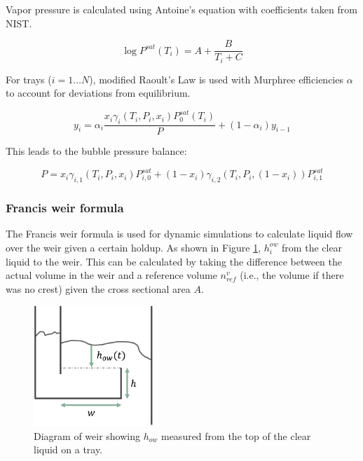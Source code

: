 Vapor pressure is calculated using Antoine’s equation with coefficients taken from NIST. 

\begin{equation}
    \log P^{sat}(T_i) = A + \frac{B}{T_i + C}
\end{equation}

For trays ($i=1\dots N$), modified Raoult’s Law is used with Murphree efficiencies $\alpha$ to account for deviations from equilibrium.

\begin{equation}
    y_i = \alpha_i\frac{x_i\gamma_i(T_i, P_i, x_i)P_0^{sat}(T_i)}{P} + (1-\alpha_i)y_{i-1}
\end{equation}

This leads to the bubble pressure balance:

\begin{equation}
    P = x_i\gamma_{i,1}(T_i, P_i, x_i)P^{sat}_{i,0} + (1-x_i)\gamma_{i,2}(T_i, P_i, (1-x_i))P^{sat}_{i,1}
\end{equation}

\subsubsection{Francis weir formula}\label{sec:francis_weir}

The Francis weir formula is used for dynamic simulations to calculate liquid flow over the weir given a certain holdup. As shown in Figure \ref{fig:weir}, $h_i^{ow}$ from the clear liquid to the weir. This can be calculated by taking the difference between the actual volume in the weir and a reference volume $n^v_{ref}$ (i.e., the volume if there was no crest) given the cross sectional area $A$.

\begin{figure}
    \centering
    \includegraphics[width=0.4\textwidth]{gfx/Chapter06/weir.png}
    \caption{Diagram of weir showing $h_{ow}$ measured from the top of the clear liquid on a tray.}
    \label{fig:weir}
\end{figure}


